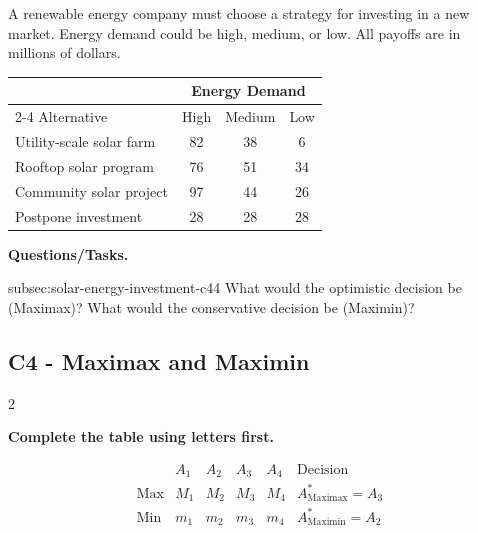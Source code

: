 	{
		A renewable energy company must choose a strategy for investing in a new
		market. Energy demand could be high, medium, or low. All payoffs are in
		millions of dollars.
		
			\begin{center}
			\renewcommand{\arraystretch}{1.3}
			\small
			\begin{tabular}{lccc}
				\toprule
				& \multicolumn{3}{c}{Energy Demand} \\
				\cmidrule(lr){2-4}
				Alternative & High & Medium & Low \\
				\midrule
				Utility-scale solar farm & 82 & 38 & 6 \\
				Rooftop solar program & 76 & 51 & 34 \\
				Community solar project & 97 & 44 & 26 \\
				Postpone investment & 28 & 28 & 28 \\
				\bottomrule
			\end{tabular}
		\end{center}
		\vspace{-5mm}
		
		\textbf{Questions/Tasks.}
		\begin{enumerate}
			\CriterionTask
			{subsec:solar-energy-investment-c4}{4}
			{What would the optimistic decision be (Maximax)? What would the conservative decision be (Maximin)? }
		\end{enumerate}
		
		\label{subsec:solar-energy-investment-c4}
		\subsection*{C4 - Maximax and Maximin }
		
		
		\begin{multicols}{2}
			
			\textbf{Complete the table using letters first.}
			
			\[
			\begin{array}{c|ccccc}
				& A_1 & A_2 & A_3 & A_4 & \text{Decision}\\
				\hline
				\text{Max} &
				M_1 & M_2 & M_3 & M_4 &
				A^*_{\mathrm{Maximax}}=A_3
				\\
				\text{Min} &
				m_1 & m_2 & m_3 & m_4 &
				A^*_{\mathrm{Maximin}}=A_2
			\end{array}
			\]
			

\end{multicols}}
